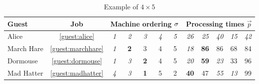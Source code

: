 \begin{table}[t]\centering
\caption{Example of $4\times5$ \JSP}\label{tbl:example}
\begin{tabular}{lc|ccccc|ccccc} \toprule
Guest & \multicolumn{1}{c}{Job} & \multicolumn{5}{c}{Machine ordering 
${\mathbf{\sigma}}$} & \multicolumn{5}{c}{Processing times $\vec{p}$} \\ \midrule
Alice & \ref{guest:alice} & \textit{1} & \textit{2} & \textit{3} & \textit{4} & 
\textit{5} & 
\textit{26} & \textit{25} & \textit{40} & \textit{15} & \textit{42} \\
March Hare & \ref{guest:marchhare} & \textit{1} & \textbf{2} & 3 & 4 & 5 & 
\textit{18} & \textbf{86} & 86 & 68 & 84 \\
Dormouse & \ref{guest:dormouse} & \textit{1} & \textit{3} & \textbf{2} & 4 & 5 
& 
\textit{20} & \textbf{59} & \textit{23} & 33 & 96 \\
Mad Hatter & \ref{guest:madhatter} & \textit{4} & \textit{3} & \textbf{1} & 5 & 
2 & \textbf{40} & 47 & \textit{55} & \textit{13} & 99 
\\
\bottomrule
\end{tabular}
\end{table}